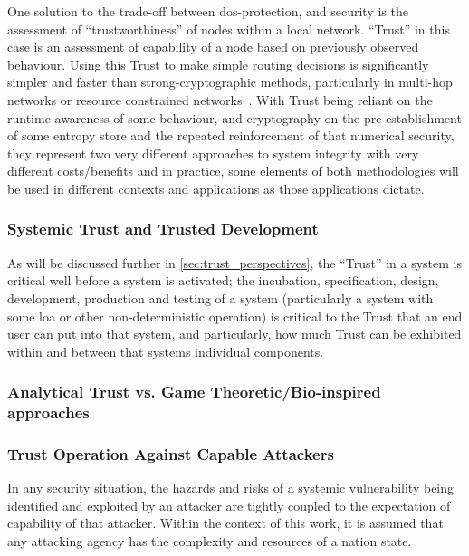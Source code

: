 One solution to the trade-off between \gls{dos}-protection, and security is the assessment of ``trustworthiness'' of nodes within a local network. 
``Trust'' in this case is an assessment of capability of a node based on previously observed behaviour. 
Using this Trust to make simple routing decisions is significantly simpler and faster than strong-cryptographic methods, particularly in multi-hop networks or resource constrained networks~\cite{Cordasco2008}.
With Trust being reliant on the runtime awareness of some behaviour, and cryptography on the pre-establishment of some entropy store and the repeated reinforcement of that numerical security, they represent two very different approaches to system integrity with very different costs/benefits and in practice, some elements of both methodologies will be used in different contexts and applications as those applications dictate.

\subsubsection{Systemic Trust and Trusted Development}
As will be discussed further in \autoref{sec:trust_perspectives}, the ``Trust'' in a system is critical well before a system is activated; the incubation, specification, design, development, production and testing of a system (particularly a system with some \gls{loa} or other non-deterministic operation) is critical to the Trust that an end user can put into that system, and particularly, how much Trust can be exhibited within and between that systems individual components.

\subsubsection{Analytical Trust vs. Game Theoretic/Bio-inspired approaches}

\subsubsection{Trust Operation Against Capable Attackers}\label{sec:capable_attackers}

In any security situation, the hazards and risks of a systemic vulnerability being identified and exploited by an attacker are tightly coupled to the expectation of capability of that attacker.
Within the context of this work, it is assumed that any attacking agency has the complexity and resources of a nation state.

